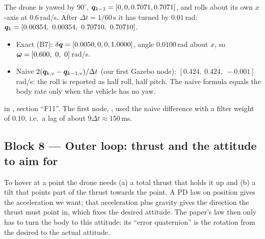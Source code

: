 \begin{toybox}
The drone is yawed by $90^\circ$, $\bm{q}_{k-1}=[0,0,0.7071,0.7071]$, and rolls about its own $x$-axis at 0.6\,rad/s. After
$\Delta t=1/60$\,s it has turned by $0.01$\,rad: $\vq_k=[0.00354,\ 0.00354,\ 0.70710,\ 0.70710]$.
\begin{itemize}[leftmargin=*]
  \item Exact (B7): $\delta\bm{q}=[0.0050,0,0,1.0000]$, angle $0.0100$\,rad about $x$, so $\vw=[0.600,\ 0,\ 0]$\,rad/s.
  \item Naive $2(\bm{q}_{k,v}-\bm{q}_{k-1,v})/\Delta t$ (our first Gazebo node): $[0.424,\ 0.424,\ -0.001]$\,rad/s: the roll is
        reported as half roll, half pitch. The naive formula equals the body rate only when the vehicle has no yaw.
\end{itemize}
\end{toybox}

\begin{projbox}
 in , section ``F11''. The first node, ,
used the naive difference with a filter weight of 0.10, i.e.\ a lag of about $9\Delta t\approx150$\,ms.
\end{projbox}

\subsection{Block 8 --- Outer loop: thrust and the attitude to aim for}
\label{sec:b8}

\begin{idea}
To hover at a point the drone needs (a) a total thrust that holds it up and (b) a tilt that points part of the
thrust towards the point. A PD law on position gives the acceleration we want; that acceleration plus gravity gives the
direction the thrust must point in, which fixes the desired attitude. The paper's law then only has to turn the body
to this attitude: its ``error quaternion'' is the rotation from the desired to the actual attitude.
\end{idea}

